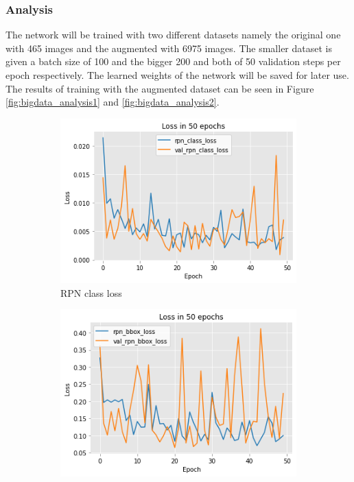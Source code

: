 \documentclass[../Head/Main.tex]{subfiles}
\begin{document}
\subsubsection*{Analysis}

The network will be trained with two different datasets namely the original one with 465 images and the augmented with 6975 images. The smaller dataset is given a batch size of 100 and the bigger 200 and both of 50 validation steps per epoch respectively. The learned weights of the network will be saved for later use. The results of training with the augmented dataset can be seen in Figure \ref{fig:bigdata_analysis1} and \ref{fig:bigdata_analysis2}. 


\begin{figure}[H]
    \centering
    \begin{subfigure}[t]{.32\textwidth}
        \centering
        \includegraphics[width=\textwidth]{../Figures/rcnn_results/loss/plot_bigdata2.png}
        \caption{RPN class loss}
        \label{fig:RPN_class_loss_bigdata}
    \end{subfigure}
    \hfill
    \begin{subfigure}[t]{.32\textwidth}
        \centering
        \includegraphics[width=\textwidth]{../Figures/rcnn_results/loss/plot_bigdata3.png}

\end{subfigure}
\end{figure}
\end{document}
